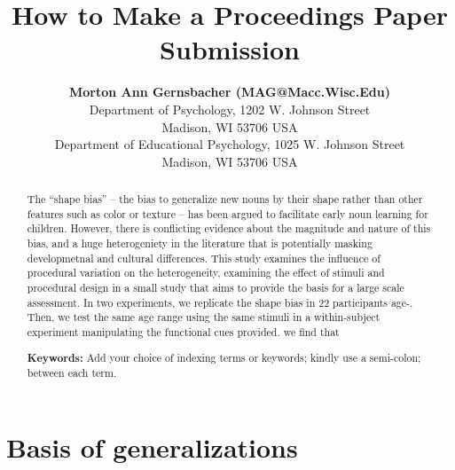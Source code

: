\documentclass[10pt, letterpaper]{article}
\title{How to Make a Proceedings Paper Submission}
\author{{\large \bf Morton Ann Gernsbacher (MAG@Macc.Wisc.Edu)} \\ Department of Psychology, 1202 W. Johnson Street \\ Madison, WI 53706 USA \AND {\large \bf Sharon J.~Derry (SDJ@Macc.Wisc.Edu)} \\ Department of Educational Psychology, 1025 W. Johnson Street \\ Madison, WI 53706 USA}
\begin{document}
\maketitle

\begin{abstract}
The ``shape bias'' -- the bias to generalize new nouns by their shape
rather than other features such as color or texture -- has been argued
to facilitate early noun learning for children. However, there is
conflicting evidence about the magnitude and nature of this bias, and a
huge heterogeniety in the literature that is potentially masking
developmetnal and cultural differences. This study examines the
influence of procedural variation on the heterogeneity, examining the
effect of stimuli and procedural design in a small study that aims to
provide the basis for a large scale assessment. In two experiments, we
replicate the shape bias in 22 participants age-. Then, we test the same
age range using the same stimuli in a within-subject experiment
manipulating the functional cues provided. we find that

\textbf{Keywords:}
Add your choice of indexing terms or keywords; kindly use a semi-colon;
between each term.
\end{abstract}

\hypertarget{basis-of-generalizations}{%
\section{Basis of generalizations}\label{basis-of-generalizations}}
\end{document}
